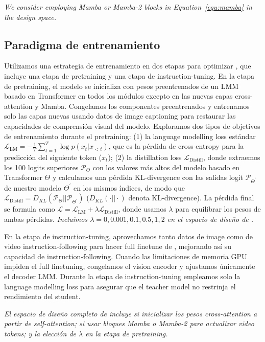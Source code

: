 \textit{We consider employing Mamba or Mamba-2 blocks in Equation~\ref{equ:mamba} in the \model design space.}

\subsection{Paradigma de entrenamiento}
\label{sec:training_paradigm}
Utilizamos una estrategia de entrenamiento en dos etapas para optimizar \model, que incluye una etapa de pretraining y una etapa de instruction-tuning. En la etapa de pretraining, el modelo se inicializa con pesos preentrenados de un LMM basado en Transformer en todos los módulos excepto en las nuevas capas cross-attention y Mamba. Congelamos los componentes preentrenados y entrenamos solo las capas nuevas usando datos de image captioning para restaurar las capacidades de comprensión visual del modelo. Exploramos dos tipos de objetivos de entrenamiento durante el pretraining: (1) la language modelling loss estándar $\mathcal{L}_{\mathrm{LM}}=-\frac{1}{T}\sum_{t=1}^{T}\log p(x_t|x_{<t})$, que es la pérdida de cross-entropy para la predicción del siguiente token ($x_t$); (2) la distillation loss $\mathcal{L}_{\mathrm{Distill}}$, donde extraemos los 100 logits superiores $\mathcal{P}_{\Theta}$ con los valores más altos del modelo basado en Transformer $\Theta$ y calculamos una pérdida KL-divergence con las salidas logit $\mathcal{P}_{\Theta^\prime}$ de nuestro modelo $\Theta^\prime$ en los mismos índices, de modo que $\mathcal{L}_{\mathrm{Distill}}=D_{KL}(\mathcal{P}_{\Theta}||\mathcal{P}_{\Theta^\prime})$
($D_{KL}(\cdot||\cdot)$ denota KL-divergence). La pérdida final se formula como $\mathcal{L}=\mathcal{L}_{\mathrm{LM}} + \lambda\mathcal{L}_{\mathrm{Distill}}$, donde usamos $\lambda$ para equilibrar los pesos de ambas pérdidas. \textit{Incluimos $\lambda=0, 0.001, 0.1, 0.5, 1, 2$ en el espacio de diseño de \model.}

En la etapa de instruction-tuning, aprovechamos tanto datos de image como de video instruction-following para hacer full finetune de \model, mejorando así su capacidad de instruction-following. Cuando las limitaciones de memoria GPU impiden el full finetuning, congelamos el vision encoder y ajustamos únicamente el decoder LMM. Durante la etapa de instruction-tuning empleamos solo la language modelling loss para asegurar que el teacher model no restrinja el rendimiento del student.

\textit{El espacio de diseño completo de \model incluye si inicializar los pesos cross-attention a partir de self-attention; si usar bloques Mamba o Mamba-2 para actualizar video tokens; y la elección de $\lambda$ en la etapa de pretraining.}
